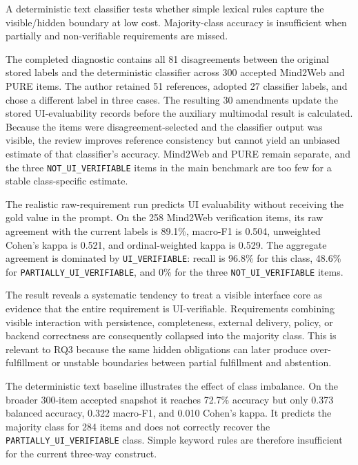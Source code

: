 A deterministic text classifier tests whether simple lexical rules capture the
visible/hidden boundary at low cost. Majority-class accuracy is insufficient
when partially and non-verifiable requirements are missed.

The completed diagnostic contains all 81 disagreements between the original
stored labels and the deterministic classifier across 300 accepted Mind2Web and
PURE items. The author retained 51 references, adopted 27 classifier labels,
and chose a different label in three cases. The resulting 30 amendments update
the stored UI-evaluability records before the auxiliary multimodal result is
calculated. Because the items were disagreement-selected and the classifier
output was visible, the review improves reference consistency but cannot yield
an unbiased estimate of that classifier's accuracy. Mind2Web and PURE remain
separate, and the three \texttt{NOT\_UI\_VERIFIABLE} items in the main benchmark are too
few for a stable class-specific estimate.

The realistic raw-requirement run predicts UI evaluability without receiving
the gold value in the prompt. On the 258 Mind2Web verification items, its raw
agreement with the current labels is 89.1\%, macro-F1 is 0.504, unweighted
Cohen's kappa is 0.521, and ordinal-weighted kappa is 0.529. The aggregate
agreement is dominated by \texttt{UI\_VERIFIABLE}: recall is 96.8\% for this class,
48.6\% for \texttt{PARTIALLY\_\allowbreak UI\_\allowbreak VERIFIABLE}, and 0\% for the three
\texttt{NOT\_UI\_VERIFIABLE} items.

The result reveals a systematic tendency to treat a visible interface core as
evidence that the entire requirement is UI-verifiable. Requirements combining
visible interaction with persistence, completeness, external delivery, policy,
or backend correctness are consequently collapsed into the majority class.
This is relevant to RQ3 because the same hidden obligations can later produce
over-fulfillment or unstable boundaries between partial fulfillment and
abstention.

The deterministic text baseline illustrates the effect of class imbalance.
On the broader 300-item accepted snapshot it reaches 72.7\% accuracy but only
0.373 balanced accuracy, 0.322 macro-F1, and 0.010 Cohen's kappa. It predicts
the majority class for 284 items and does not correctly recover the
\texttt{PARTIALLY\_\allowbreak UI\_\allowbreak VERIFIABLE} class. Simple keyword rules are therefore
insufficient for the current three-way construct.


